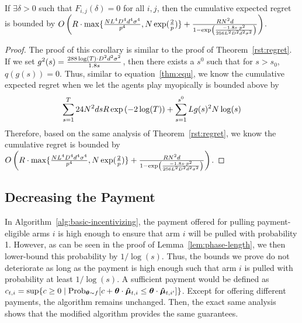 
\begin{corollary} \label{cor:constant-regret}
If $\exists \delta>0$ such that $F_{i,j}(\delta)=0$ for all $i,j$, then the cumulative expected regret is bounded by $O \left(R\cdot \max\{\frac{N L^4 D^4 d^4 \sigma^4}{p^4}, N\exp(\frac{2}{p})\}
  + \frac{R N^2 d}{1 - \exp \left(
    \frac{-1.8 s \cdot p^2}{256 L^2 D^2 d^2 \sigma^2}
  \right)} \right) $.
\end{corollary}

\begin{proof}
The proof of this corollary is similar to the proof of Theorem~\ref{rst:regret}. If we set $g^2(s) = \frac{288\log(T) \cdot D^2 d^2 \sigma^2}{1.8 s}$, then there exists a $s^{0}$ such that for $s>s_{0}$, $q(g(s))=0$. Thus, similar to equation~\eqref{thm:equ}, we know the cumulative expected regret when we let the agents play myopically is bounded above by
\begin{align}
\sum_{s=1}^{T} 24N^2 d s R \exp\left(-2\log(T)\right)+ \sum_{s=1}^{s^{0}}L g(s)^2N\log(s) \nonumber
\end{align}
Therefore, based on the same analysis of Theorem~\ref{rst:regret}, we know the cumulative regret is bounded by $O \left(R\cdot \max\{\frac{N L^4 D^4 d^4 \sigma^4}{p^4}, N\exp(\frac{2}{p})\}
  + \frac{R N^2 d}{1 - \exp \left(
    \frac{-1.8 s \cdot p^2}{256 L^2 D^2 d^2 \sigma^2}
  \right)} \right) $.
\end{proof}

\subsection{Decreasing the Payment} \label{sec:pi}

In Algorithm~\ref{alg:basic-incentivizing},
the payment  offered for pulling payment-eligible arms $i$
is high enough to ensure that arm $i$ will be pulled with probability 1.
However, as can be seen in the proof of Lemma~\ref{lem:phase-length},
we then lower-bound this probability by $1/\log(s)$.
Thus, the bounds we prove do not deteriorate as long as the payment is
high enough such that arm $i$ is pulled with probability at least $1/\log(s)$.
A sufficient payment would be defined as
$\Pay{t}{i} = \sup \Set{c \geq 0}{%
  \Prob[\AgV \sim \AgentDist]{c + \AgV \cdot \ArmEV{t}{i} \leq \AgV \cdot \ArmEV{t}{i'}}}$.
Except for offering different payments, the algorithm remains unchanged.
Then, the exact same analysis shows that the modified algorithm
provides the same guarantees.
